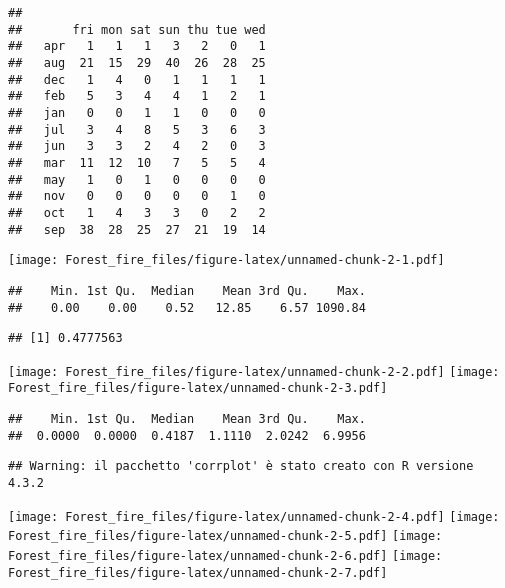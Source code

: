 \documentclass[
]{article}
\begin{document}
\begin{verbatim}
##      
##       fri mon sat sun thu tue wed
##   apr   1   1   1   3   2   0   1
##   aug  21  15  29  40  26  28  25
##   dec   1   4   0   1   1   1   1
##   feb   5   3   4   4   1   2   1
##   jan   0   0   1   1   0   0   0
##   jul   3   4   8   5   3   6   3
##   jun   3   3   2   4   2   0   3
##   mar  11  12  10   7   5   5   4
##   may   1   0   1   0   0   0   0
##   nov   0   0   0   0   0   1   0
##   oct   1   4   3   3   0   2   2
##   sep  38  28  25  27  21  19  14
\end{verbatim}

\texttt{[image: Forest\_fire\_files/figure-latex/unnamed-chunk-2-1.pdf]}

\begin{verbatim}
##    Min. 1st Qu.  Median    Mean 3rd Qu.    Max. 
##    0.00    0.00    0.52   12.85    6.57 1090.84
\end{verbatim}

\begin{verbatim}
## [1] 0.4777563
\end{verbatim}

\texttt{[image: Forest\_fire\_files/figure-latex/unnamed-chunk-2-2.pdf]}
\texttt{[image: Forest\_fire\_files/figure-latex/unnamed-chunk-2-3.pdf]}

\begin{verbatim}
##    Min. 1st Qu.  Median    Mean 3rd Qu.    Max. 
##  0.0000  0.0000  0.4187  1.1110  2.0242  6.9956
\end{verbatim}

\begin{verbatim}
## Warning: il pacchetto 'corrplot' è stato creato con R versione 4.3.2
\end{verbatim}

\texttt{[image: Forest\_fire\_files/figure-latex/unnamed-chunk-2-4.pdf]}
\texttt{[image: Forest\_fire\_files/figure-latex/unnamed-chunk-2-5.pdf]}
\texttt{[image: Forest\_fire\_files/figure-latex/unnamed-chunk-2-6.pdf]}
\texttt{[image: Forest\_fire\_files/figure-latex/unnamed-chunk-2-7.pdf]}
\end{document}
